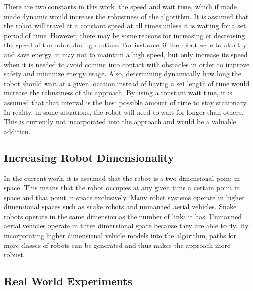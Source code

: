 \documentclass[letterpaper, 10pt, conference]{ieeeconf}
\begin{document}
There are two constants in this work, the speed and wait time, which if made
made dynamic would increase the robustness of the algorithm. It is assumed that
the robot will travel at a constant speed at all times unless it is waiting for
a set period of time. However, there may be some reasons for increasing or
decreasing the speed of the robot during runtime. For instance, if the robot
were to also try and save energy, it may not to maintain a high speed, but only
increase its speed when it is needed to avoid coming into contact with
obstacles in order to improve safety and minimize energy usage. Also,
determining dynamically how long the robot should wait at a given location
instead of having a set length of time would increase the robustness of the
approach. By using a constant wait time, it is assumed that that interval is
the best possible amount of time to stay stationary. In reality, in some
situations, the robot will need to wait for longer than others. This is
currently not incorporated into the approach and would be a valuable addition.

\subsection{Increasing Robot Dimensionality}

In the current work, it is assumed that the robot is a two dimensional point in
space. This means that the robot occupies at any given time a certain point in
space and that point in space exclusively. Many robot systems operate in higher
dimensional spaces such as snake robots and unmanned aerial vehicles. Snake
robots operate in the same dimension as the number of links it has. Unmanned
aerial vehicles operate in three dimensional space because they are able to
fly. By incorporating higher dimensional vehicle models into the algorithm,
paths for more classes of robots can be generated and thus makes the approach
more robust.

\subsection{Real World Experiments}
\end{document}
